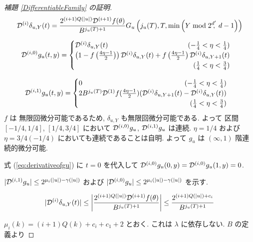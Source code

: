 \begin{proof}[\rm 補題 \ref{DifferentiableFamily} の証明]
  \begin{equation}
   \mathcal D^{(i)}\delta_{u,Y}(t) 
    = \frac{2^{(i+1){Q(|u|)}} \mathcal D^{(i+1)}f(\theta)}{B^{j_u(T)+1}}
    G_u\left( j_u(T), T, \min \left(Y \bmod 2^{d'}\!\!\!,\ d-1 \right) \right)
  \end{equation}

  \begin{equation}
   \label{eq:derivativeofgu}
    \D{i,0} g_u(t, y)
     = \begin{cases}
	\D{i} \delta_{u, Y}(t) 
	\hfill (- \frac 1 4 < \eta < \frac 1 4) \\
	\left( 1-f \left(\frac{4\eta-1}{2}\right)\right) 
	\D{i} \delta_{u, Y}(t) 
	+ f \left(\frac{4\eta-1}{2}\right) \D{i} \delta_{u,Y+1}(t) \\
	\hfill (\frac 1 4 < \eta < \frac 3 4)
       \end{cases}
  \end{equation}   

  \begin{equation}
    \D{i,1} g_u(t, y)
     = \begin{cases}
	0 \hfill (- \frac 1 4 < \eta < \frac 1 4) \\
	2B^{j_u(T)}\D{1}f(\frac{4\eta - 1}2)
	(\D{i}\delta_{u,Y+1}(t)-\D{i}\delta_{u, Y}(t)) \\
	\hfill (\frac 1 4 < \eta < \frac 3 4)
       \end{cases}
  \end{equation}
  $f$ は 無限回微分可能であるため, $\delta_{u,Y}$ も無限回微分可能である.
  よって 区間 $[-1/4, 1/4]$, $[1/4, 3/4]$ において
  $\mathcal D^{(i,0)} g_u$, $\mathcal D^{(i,1)} g_u$ は連続. 
  $\eta = 1/4$ および  $\eta = 3/4(-1/4)$ においても連続であることは自明.
  よって $g_u$ は $(\infty, 1)$ 階連続的微分可能.

  式 (\ref{eq:derivativeofgu}) に $t = 0$ を代入して
  $\mathcal D^{(i, 0)} g_u(0,y) = \mathcal D^{(i, 0)} g_u(1,y) = 0$.

  $|\mathcal D^{(i,1)} g_u| \leq 2^{\mu_i (|u|) - \gamma(|u|)}$ および
  $|\mathcal D^{(i,0)} g_u| \leq 2^{\mu_i (|u|) - \gamma(|u|)}$ を示す.

  \begin{equation}
   |\mathcal D^{(i)}\delta_{u, Y}(t)| 
    \le \left|\frac{2^{(i+1){Q(|u|)}}\mathcal D^{(i+1)}f(\theta)}{B^{j_u(T)+1}} \right|
    \le \frac{2^{(i+1){Q(|u|)} + c_i}}{B^{j_u(T)+1}}\\
  \end{equation}

  $\mu_i(k) = (i+1)Q(k) + c_i + c_1 + 2$ とおく.
  これは $\lambda$ に依存しない.
  $B$ の定義より


\end{proof}
